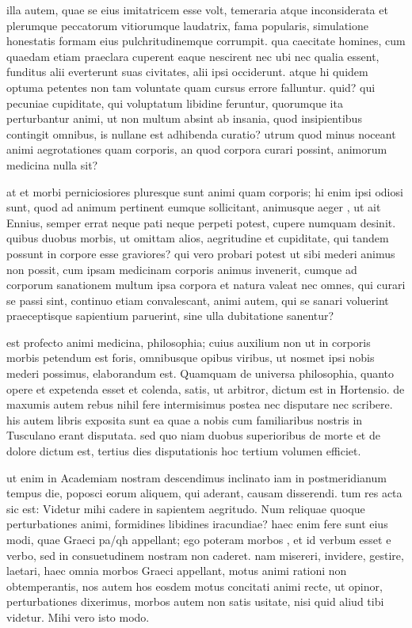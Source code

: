 illa autem, quae se eius imitatricem esse volt, temeraria atque inconsiderata et plerumque peccatorum vitiorumque laudatrix, fama popularis, simulatione honestatis formam eius pulchritudinemque corrumpit. qua caecitate homines, cum quaedam etiam praeclara cuperent eaque nescirent nec ubi nec qualia essent, funditus alii everterunt suas civitates, alii ipsi occiderunt. atque hi quidem optuma petentes non tam voluntate quam cursus errore falluntur. quid? qui pecuniae cupiditate, qui voluptatum libidine feruntur, quorumque ita perturbantur animi, ut non multum absint ab insania, quod insipientibus contingit omnibus, is nullane est adhibenda curatio? utrum quod minus noceant animi aegrotationes quam corporis, an quod corpora curari possint, animorum medicina nulla sit?

 at et morbi perniciosiores pluresque sunt animi quam corporis; hi enim ipsi odiosi sunt, quod ad animum pertinent eumque sollicitant, animusque aeger , ut ait Ennius, semper errat neque pati neque perpeti potest, cupere numquam desinit. quibus duobus morbis, ut omittam alios, aegritudine et cupiditate, qui tandem possunt in corpore esse graviores? qui vero probari potest ut sibi mederi animus non possit, cum ipsam medicinam corporis animus invenerit, cumque ad corporum sanationem multum ipsa corpora et natura valeat nec omnes, qui curari se passi sint, continuo etiam convalescant, animi autem, qui se sanari voluerint praeceptisque sapientium paruerint, sine ulla dubitatione sanentur?

 est profecto animi medicina, philosophia; cuius auxilium non ut in corporis morbis petendum est foris, omnibusque opibus viribus, ut nosmet ipsi nobis mederi possimus, elaborandum est. Quamquam de universa philosophia, quanto opere et expetenda esset et colenda, satis, ut arbitror, dictum est in Hortensio. de maxumis autem rebus nihil fere intermisimus postea nec disputare nec scribere. his autem libris exposita sunt ea quae a nobis cum familiaribus nostris in Tusculano erant disputata. sed quo niam duobus superioribus de morte et de dolore dictum est, tertius dies disputationis hoc tertium volumen efficiet.

 ut enim in Academiam nostram descendimus inclinato iam in postmeridianum tempus die, poposci eorum aliquem, qui aderant, causam disserendi. tum res acta sic est: Videtur mihi cadere in sapientem aegritudo. Num reliquae quoque perturbationes animi, formidines libidines iracundiae? haec enim fere sunt eius modi, quae Graeci pa/qh appellant; ego poteram morbos , et id verbum esset e verbo, sed in consuetudinem nostram non caderet. nam misereri, invidere, gestire, laetari, haec omnia morbos Graeci appellant, motus animi rationi non obtemperantis, nos autem hos eosdem motus concitati animi recte, ut opinor, perturbationes dixerimus, morbos autem non satis usitate, nisi quid aliud tibi videtur. Mihi vero isto modo.

